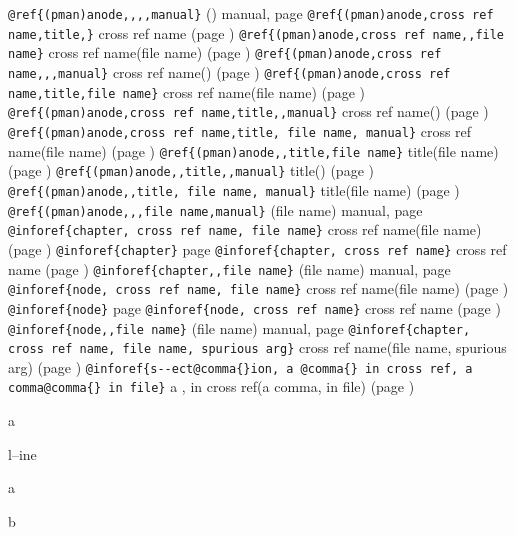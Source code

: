 \documentclass{book}
\begin{document}
\texttt{@ref\{(pman)anode,,,,manual\}} () manual, page \pageref{anchor:_0028pman_0029anode}
\texttt{@ref\{(pman)anode,cross ref name,title,\}} cross ref name (page \pageref{anchor:_0028pman_0029anode})
\texttt{@ref\{(pman)anode,cross ref name,,file name\}} cross ref name(file name) (page \pageref{anchor:_0028pman_0029anode})
\texttt{@ref\{(pman)anode,cross ref name,,,manual\}} cross ref name() (page \pageref{anchor:_0028pman_0029anode})
\texttt{@ref\{(pman)anode,cross ref name,title,file name\}} cross ref name(file name) (page \pageref{anchor:_0028pman_0029anode})
\texttt{@ref\{(pman)anode,cross ref name,title,,manual\}} cross ref name() (page \pageref{anchor:_0028pman_0029anode})
\texttt{@ref\{(pman)anode,cross ref name,title, file name, manual\}} cross ref name(file name) (page \pageref{anchor:_0028pman_0029anode})
\texttt{@ref\{(pman)anode,,title,file name\}} title(file name) (page \pageref{anchor:_0028pman_0029anode})
\texttt{@ref\{(pman)anode,,title,,manual\}} title() (page \pageref{anchor:_0028pman_0029anode})
\texttt{@ref\{(pman)anode,,title, file name, manual\}} title(file name) (page \pageref{anchor:_0028pman_0029anode})
\texttt{@ref\{(pman)anode,,,file name,manual\}} (file name) manual, page \pageref{anchor:_0028pman_0029anode}
\texttt{@inforef\{chapter, cross ref name, file name\}} cross ref name(file name) (page \pageref{anchor:chapter})
\texttt{@inforef\{chapter\}} page \pageref{anchor:chapter}
\texttt{@inforef\{chapter, cross ref name\}} cross ref name (page \pageref{anchor:chapter})
\texttt{@inforef\{chapter,,file name\}} (file name) manual, page \pageref{anchor:chapter}
\texttt{@inforef\{node, cross ref name, file name\}} cross ref name(file name) (page \pageref{anchor:node})
\texttt{@inforef\{node\}} page \pageref{anchor:node}
\texttt{@inforef\{node, cross ref name\}} cross ref name (page \pageref{anchor:node})
\texttt{@inforef\{node,,file name\}} (file name) manual, page \pageref{anchor:node}
\texttt{@inforef\{chapter, cross ref name, file name, spurious arg\}} cross ref name(file name, spurious arg) (page \pageref{anchor:chapter})
\texttt{@inforef\{s{-}{-}ect@comma\{\}ion, a @comma\{\} in cross
ref, a comma@comma\{\} in file\}}
a , in cross
ref(a comma, in file) (page \pageref{anchor:s_002d_002dect_002cion})




a


l--ine




a




b
\end{document}
